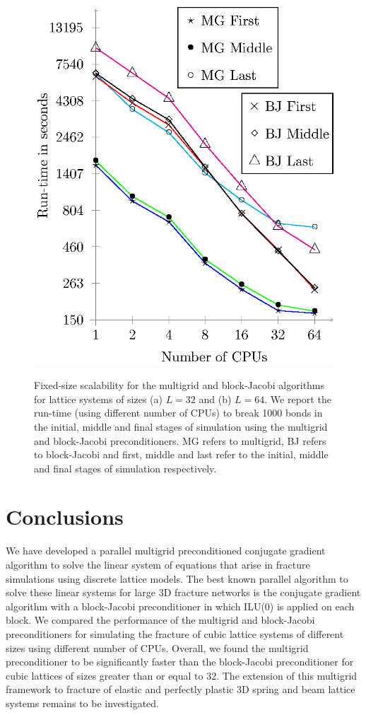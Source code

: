 \documentclass[11pt]{iopart}
\begin{document}
\begin{figure}
\begin{center}
{\includegraphics[scale=0.9]{fs64.eps}
}
\caption{ Fixed-size scalability for the multigrid and block-Jacobi algorithms for lattice systems of sizes (a) $L = 32$ and (b) $L = 64$.
 We report the run-time (using different number of CPUs) to break 1000 bonds in the initial, middle and final stages 
 of simulation using the multigrid and block-Jacobi preconditioners. MG refers to multigrid, BJ refers 
 to block-Jacobi and first, middle and last refer to the initial, middle and final stages of simulation respectively.}
\end{center}
\end{figure}

\section{Conclusions}
\label{sec:conclude}
We have developed a parallel multigrid preconditioned conjugate gradient algorithm to solve the
 linear system of equations that arise in fracture simulations using discrete 
lattice models. The best known parallel algorithm to solve these linear systems for large 3D 
fracture networks is the conjugate gradient algorithm with a block-Jacobi
preconditioner in which ILU(0) is applied on each block. We compared the performance of the multigrid
and block-Jacobi preconditioners for simulating the fracture of cubic lattice systems of different sizes 
using different number of CPUs. Overall, we found the multigrid preconditioner to be significantly faster
than the block-Jacobi preconditioner for cubic lattices of sizes greater than or equal to 32. 
The extension of this multigrid framework to fracture of elastic and perfectly plastic 
3D spring and beam lattice systems remains to be investigated.
\end{document}
